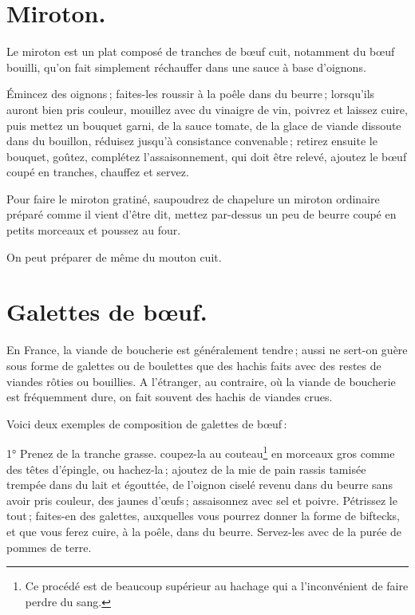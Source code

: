\section*{\centering Miroton.}
{}

Le miroton est un plat composé de tranches de bœuf cuit, notamment du bœuf
bouilli, qu'on fait simplement réchauffer dans une sauce à base d'oignons.

Émincez des oignons ; faites-les roussir à la poêle dans du beurre ; lorsqu'ils
auront bien pris couleur, mouillez avec du vinaigre de vin, poivrez et laissez
cuire, puis mettez un bouquet garni, de la sauce tomate, de la glace de viande
dissoute dans du bouillon, réduisez jusqu'à consistance convenable ; retirez
ensuite le bouquet, goûtez, complétez l'assaisonnement, qui doit être relevé,
ajoutez le bœuf coupé en tranches, chauffez et servez.

\sk

Pour faire le miroton gratiné, saupoudrez de chapelure un miroton ordinaire
préparé comme il vient d'être dit, mettez par-dessus un peu de beurre coupé en
petits morceaux et poussez au four.

\sk

On peut préparer de même du mouton cuit.

\section*{\centering Galettes de bœuf.}
{}


En France, la viande de boucherie est généralement tendre ; aussi ne sert-on
guère sous forme de galettes ou de boulettes que des hachis faits avec des
restes de viandes rôties ou bouillies. A l'étranger, au contraire, où la viande
de boucherie est fréquemment dure, on fait souvent des hachis de viandes crues.

Voici deux exemples de composition de galettes de bœuf :

\medskip

1° Prenez de la tranche grasse. coupez-la au couteau\footnote{Ce procédé est de
beaucoup supérieur au hachage qui a l'inconvénient de faire perdre du sang.} en
morceaux gros comme des têtes d'épingle, ou hachez-la ; ajoutez de la mie de
pain rassis tamisée trempée dans du lait et égouttée, de l'oignon ciselé revenu
dans du beurre sans avoir pris couleur, des jaunes d'œufs ; assaisonnez avec
sel et poivre. Pétrissez le tout ; faites-en des galettes, auxquelles vous
pourrez donner la forme de biftecks, et que vous ferez cuire, à la poêle, dans
du beurre. Servez-les avec de la purée de pommes de terre.

